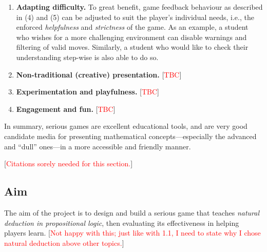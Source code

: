 \documentclass[a4paper]{article}
\newcommand{\comment}[1]{[\textcolor{red}{#1}]} %
\begin{document}
\begin{enumerate}
  \item \textbf{Adapting difficulty.} To great benefit, game feedback behaviour as described in (4) and (5) can be adjusted to suit the player's individual needs, i.e., the enforced \emph{helpfulness} and \emph{strictness} of the game. As an example, a student who wishes for a more challenging environment can disable warnings and filtering of valid moves. Similarly, a student who would like to check their understanding step-wise is also able to do so.
  \item \textbf{Non-traditional (creative) presentation.} \comment{TBC}
  \item \textbf{Experimentation and playfulness.} \comment{TBC} %
  \item \textbf{Engagement and fun.} \comment{TBC}
\end{enumerate}


In summary, serious games are excellent educational tools, and are very good candidate media for presenting mathematical concepts---especially the advanced and ``dull'' ones---in a more accessible and friendly manner.

\comment{Citations sorely needed for this section.}

\subsection{Aim}
The aim of the project is to design and build a serious game that teaches \emph{natural deduction in propositional logic}, then evaluating its effectiveness in helping players learn. \comment{Not happy with this; just like with 1.1, I need to state why I chose natural deduction above other topics.}

\end{document}
